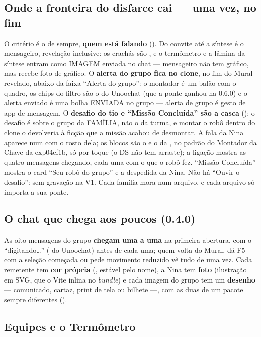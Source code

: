 \subsection{Onde a fronteira do disfarce cai --- uma vez, no fim}

O critério é o de sempre, \textbf{quem está falando} (). Do convite
até a síntese é o mensageiro, revelação inclusive: os crachás são
, e o termômetro e a lâmina da síntese entram como IMAGEM enviada
no chat --- mensageiro não tem gráfico, mas recebe foto de gráfico. O
\textbf{alerta do grupo fica no clone}, no fim do Mural revelado, abaixo da
faixa \enquote{Alerta do grupo}: o montador é um balão com o quadro, os chips
do filtro são o  do Unoochat (que a ponte ganhou na 0.6.0) e
o alerta enviado é uma bolha ENVIADA no grupo --- alerta de grupo é gesto de
app de mensagem. O \textbf{desafio do tio e \enquote{Missão Concluída} são a
casca} (): o desafio é sobre o grupo da FAMÍLIA, não o da
turma, e montar o robô dentro do clone o devolveria à ficção que a missão
acabou de desmontar. A fala da Nina aparece num  com o rosto dela;
os blocos são o  e o  da , no
padrão do Montador da Chave da exp04ef1b, só por toque (o DS não tem
arraste); a ligação mostra as quatro mensagens chegando, cada uma com o que
o robô fez. \enquote{Missão Concluída} mostra o card \enquote{Seu robô do
grupo} e a despedida da Nina. Não há \enquote{Ouvir o desafio}: sem
gravação na V1. Cada família mora num arquivo, e
cada arquivo só importa a sua ponte.

\subsection{O chat que chega aos poucos (0.4.0)}

As oito mensagens do grupo \textbf{chegam uma a uma} na primeira abertura, com o
\enquote{digitando\ldots} ( do Unoochat) antes de cada
uma; quem volta do Mural, dá F5 com a seleção começada ou pede movimento
reduzido vê tudo de uma vez. Cada remetente tem \textbf{cor própria}
(, estável pelo nome), a Nina tem \textbf{foto} (ilustração em
SVG, que o Vite inlina no \emph{bundle}) e cada imagem do grupo tem um
\textbf{desenho} --- comunicado, cartaz, print de tela ou bilhete ---, com as
duas de um pacote sempre diferentes ().

\subsection{Equipes e o Termômetro}

